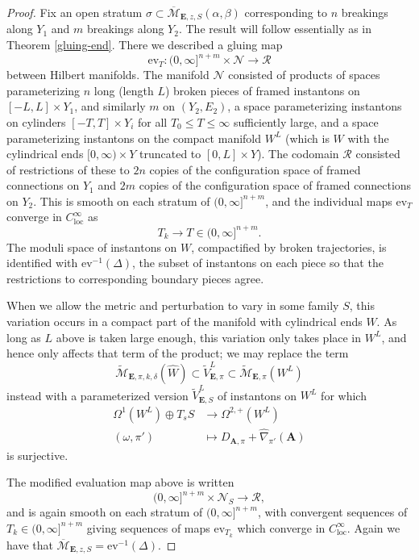 \documentclass{memo-l}
\theoremstyle{definition}
\theoremstyle{remark}
\numberwithin{section}{chapter}
\numberwithin{equation}{chapter}
\begin{document}
\begin{proof}Fix an open stratum $\sigma \subset \overline{\mathcal M}_{\mathbf{E},z,S}(\alpha, \beta)$ corresponding to $n$ breakings along $Y_1$ and $m$ breakings along $Y_2$. The result will follow essentially as in Theorem \ref{gluing-end}. There we described a gluing map $$\text{ev}_T: (0,\infty]^{n+m} \times \mathcal N \to \mathcal R$$ between Hilbert manifolds. The manifold $\mathcal N$ consisted of products of spaces parameterizing $n$ long (length $L$) broken pieces of framed instantons on $[-L, L] \times Y_1$, and similarly $m$ on $(Y_2, E_2)$, a space parameterizing instantons on cylinders $[-T, T] \times Y_i$ for all $T_0 \leq T \leq \infty$ sufficiently large, and a space parameterizing instantons on the compact manifold $W^L$ (which is $W$ with the cylindrical ends $[0, \infty) \times Y$ truncated to $[0, L] \times Y$). The codomain $\mathcal R$ consisted of restrictions of these to $2n$ copies of the configuration space of framed connections on $Y_1$ and $2m$ copies of the configuration space of framed connections on $Y_2$. This is smooth on each stratum of $(0,\infty]^{n+m}$, and the individual maps $\text{ev}_T$ converge in $C^\infty_{\text{loc}}$ as
$$T_k \to T \in (0,\infty]^{n+m}.$$
The moduli space of instantons on $W$, compactified by broken trajectories, is identified with $\text{ev}^{-1}(\Delta)$, the subset of instantons on each piece so that the restrictions to corresponding boundary pieces agree.

When we allow the metric and perturbation to vary in some family $S$, this variation occurs in a compact part of the manifold with cylindrical ends $\hat W$. As long as $L$ above is taken large enough, this variation only takes place in $W^L$, and hence only affects that term of the product; we may replace the term
$$\widetilde{\mathcal M}_{\mathbf{E},\pi,k,\delta}(\hat W) \subset \widetilde V^L_{\mathbf{E},\pi} \subset \widetilde{\mathcal M}_{\mathbf{E},\pi}(W^L)$$
instead with a parameterized version $\widetilde{V}^L_{\mathbf{E},S}$ of instantons on $W^L$ for which
\begin{align*}\Omega^1(W^L) \oplus T_s S &\to \Omega^{2,+}(W^L)\\
(\omega, \pi') &\mapsto D_{\mathbf{A},\pi} + \widehat{\nabla}_{\pi'}(\mathbf{A})\end{align*}
is surjective.

The modified evaluation map above is written
$$(0,\infty]^{n+m} \times \mathcal N_S \to \mathcal R,$$
and is again smooth on each stratum of $(0,\infty]^{n+m}$, with convergent sequences of $T_k \in (0,\infty]^{n+m}$ giving sequences of maps $\text{ev}_{T_k}$ which converge in $C^\infty_{\text{loc}}$. Again we have that $\overline{\mathcal M}_{\mathbf{E},z,S} = \text{ev}^{-1}(\Delta)$.


\end{proof}
\end{document}
